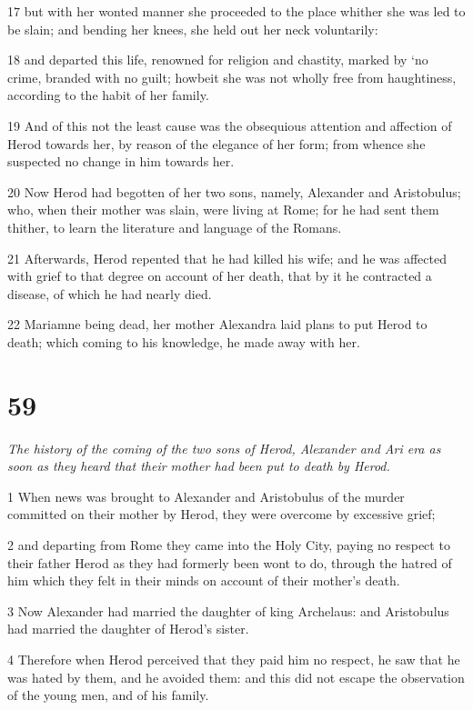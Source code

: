 17 but with her wonted manner she proceeded to the place whither she was led to be slain; and bending her knees, she held out her neck voluntarily: 

18 and departed this life, renowned for religion and chastity, marked by ‘no crime, branded with no guilt; howbeit she was not wholly free from haughtiness, according to the habit of her family. 

19 And of this not the least cause was the obsequious attention and affection of Herod towards her, by reason of the elegance of her form; from whence she suspected no change in him towards her. 

20 Now Herod had begotten of her two sons, namely, Alexander and Aristobulus; who, when their mother was slain, were living at Rome; for he had sent them thither, to learn the literature and language of the Romans. 

21 Afterwards, Herod repented that he had killed his wife; and he was affected with grief to that degree on account of her death, that by it he contracted a disease, of which he had nearly died. 

22 Mariamne being dead, her mother Alexandra laid plans to put Herod to death; which coming to his knowledge, he made away with her. 

\chapter{59}

\par \textit{The history of the coming of the two sons of Herod, Alexander and Ari era as soon as they heard that their mother had been put to death by Herod.}

1 When news was brought to Alexander and Aristobulus of the murder committed on their mother by Herod, they were overcome by excessive grief; 

2 and departing from Rome they came into the Holy City, paying no respect to their father Herod as they had formerly been wont to do, through the hatred of him which they felt in their minds on account of their mother’s death. 

3 Now Alexander had married the daughter of king Archelaus: and Aristobulus had married the daughter of Herod’s sister. 

4 Therefore when Herod perceived that they paid him no respect, he saw that he was hated by them, and he avoided them: and this did not escape the observation of the young men, and of his family. 

